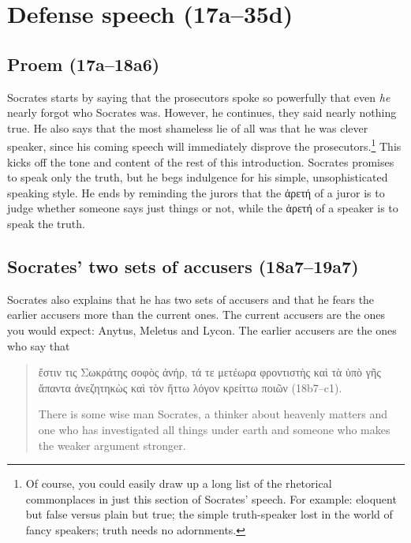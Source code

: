 \documentclass[11pt]{article}
\begin{document}

\section{Defense speech (17a--35d)}

\subsection{Proem (17a--18a6)}

Socrates starts by saying that the prosecutors spoke so powerfully that even
\emph{he} nearly forgot who Socrates was.  However, he continues, they said
nearly nothing true.   He also says that the most shameless lie of all was that
he was clever speaker, since his coming speech will immediately disprove the
prosecutors.\footnote{Of course, you could easily draw up a long list of the
rhetorical commonplaces in just this section of Socrates' speech.  For example:
eloquent but false versus plain but true; the simple truth-speaker lost in the
world of fancy speakers; truth needs no adornments.}  This kicks off the tone
and content of the rest of this introduction.  Socrates promises to speak only
the truth, but he begs indulgence for his simple, unsophisticated speaking
style.  He ends by reminding the jurors that the {\g ἀρετή} of a juror is to
judge whether someone says just things or not, while the {\g ἀρετή} of
a speaker is to speak the truth.


\subsection{Socrates' two sets of accusers (18a7--19a7)}

Socrates also explains that he has two sets of accusers and that he fears the
earlier accusers more than the current ones.  The current accusers are the ones
you would expect: Anytus, Meletus and Lycon.  The earlier accusers are the ones
who say that

\begin{quote}
    {\g ἔστιν τις Σωκράτης σοφὸς ἀνήρ, τά τε μετέωρα φροντιστὴς καὶ τὰ ὑπὸ γῆς
    ἅπαντα ἀνεζητηκὼς καὶ τὸν ἥττω λόγον κρείττω ποιῶν} (18b7--c1).

    There is some wise man Socrates, a thinker about heavenly matters and one
    who has investigated all things under earth and someone who makes the
    weaker argument stronger.
\end{quote}
\end{document}
